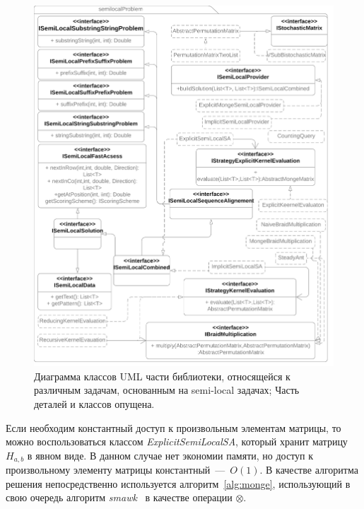 \begin{figure}
  \centering
  \includegraphics[height=1.2\columnwidth,angle=0]{Mishin/figures/Library.png}
  \caption{Диаграмма классов UML части библиотеки, относящейся к различным задачам, основанным на  semi-local задачах; Часть деталей и классов опущена.}\label{fig:libraryProblem}
\end{figure}

Если необходим константный доступ к произвольным элементам матрицы, то можно воспользоваться классом \emph{ExplicitSemiLocalSA}, который хранит матрицу $H_{a,b}$ в явном виде.
В данном случае нет экономии памяти, но доступ к произвольному элементу матрицы константный~---~$O(1)$. 
В качестве алгоритма решения непосредственно используется алгоритм~\ref{alg:monge}, использующий в свою очередь алгоритм \emph{smawk}~\cite{aggarwal1987geometric} в качестве операции $\otimes$.






